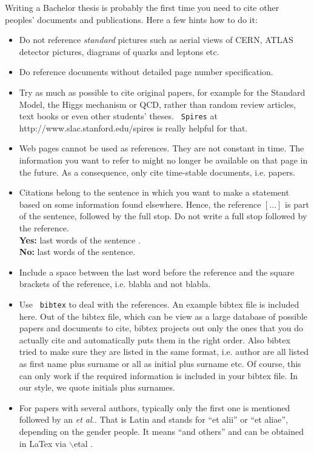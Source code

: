 \documentclass[bachelor,       %
               twoside,        %
               BCOR10mm,       %
               ngerman,english  %
               ]{GAUBM}
\begin{document}
%
%
Writing a Bachelor thesis is probably the first time you need to cite
other peoples' documents and publications. Here a few hints how to do
it:
\begin{itemize}
\item Do not reference \textit{ standard} pictures such as aerial views of
  CERN, ATLAS detector pictures, diagrams of quarks and leptons etc.
\item Do reference documents without detailed page number specification.
\item Try as much as possible to cite original papers, for example for
  the Standard Model, the Higgs mechanism or QCD, rather than random
  review articles, text books or even other students' theses. \texttt{
    Spires} at http://www.slac.stanford.edu/spires is really helpful
  for that.
\item Web pages cannot be used as references. They are not constant in
  time. The information you want to refer to might no longer be
  available on that page in the future. As a consequence, only cite
  time-stable documents, i.e. papers.
\item Citations belong to the sentence in which you want to make a
  statement based on some information found elsewhere. Hence, the
  reference $\left[ \dots \right]$ is part of the sentence, followed
  by the full
  stop. Do not write a full stop followed by the reference.\\
  \textbf{ Yes:} last words of the sentence \cite{bauer_orr_01}.\\
  \textbf{ No:} last words of the sentence. \cite{abe_prl74_1995}
\item Include a space between the last word before the reference and
  the square brackets of the reference, i.e. blabla
  \cite{abachi_prl74_1995,pdg2002} and not
  blabla\cite{abachi_prl74_1995,pdg2004}.
\item Use \texttt{ bibtex} to deal with the references. An example bibtex
  file is included here. Out of the bibtex file, which can be view as
  a large database of possible papers and documents to cite, bibtex
  projects out only the ones that you do actually cite and
  automatically puts them in the right order. Also bibtex tried to
  make sure they are listed in the same format, i.e. author are all
  listed as first name plus surname or all as initial plus surname
  etc. Of course, this can only work if the required information is
  included in your bibtex file. In our style, we quote initials plus
  surnames.
\item For papers with several authors, typically only the first one is
  mentioned followed by an \textit{ et al.}. That is Latin and stands for
  ``et alii'' or ``et aliae'', depending on the gender people. It
  means ``and others'' and can be obtained in LaTex via
  $\backslash$etal  .
\end{itemize}
\end{document}
